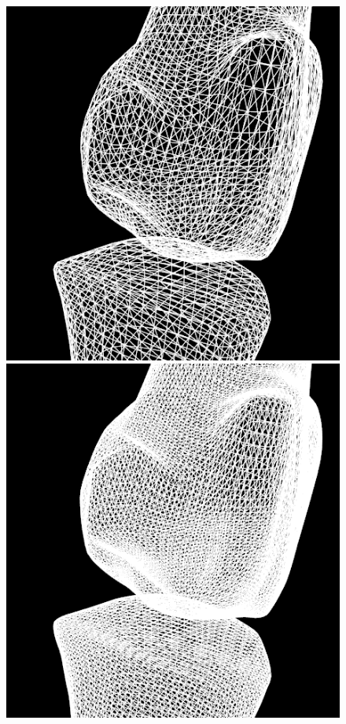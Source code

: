 \documentclass[10pt, conference, compsocconf]{IEEEtran}
\begin{document}
\begin{figure}[htbp]
{\begin{minipage}[h]{0.16\linewidth}
        \includegraphics[width=\textwidth]{./Figure/footbones/fingerBones/combined2-.png}\\
        \includegraphics[width=\textwidth]{./Figure/footbones/fingerBones/combined3-.png}\vspace{1ex}\\

\end{minipage}}
\end{figure}
\end{document}
